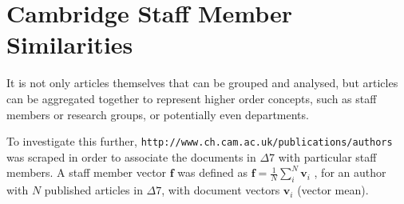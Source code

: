 \section{Cambridge Staff Member Similarities}
\label{sec:AUTHORCLUSTERS}

It is not only articles themselves that can be grouped and analysed, but articles can be aggregated together to represent higher order concepts, such as staff members or research groups, or potentially even departments. 

To investigate this further, \texttt{http://www.ch.cam.ac.uk/publications/authors} was scraped in order to associate the documents in $\Delta7$ with particular staff members. A staff member vector $\textbf{f}$ was defined as $\mathbf{f}=\frac{1}{N}\sum_{i}^{N} \mathbf{v}_i$ , for an author with $N$ published articles in $\Delta7$, with document vectors $\mathbf{v}_i$ (vector mean).

